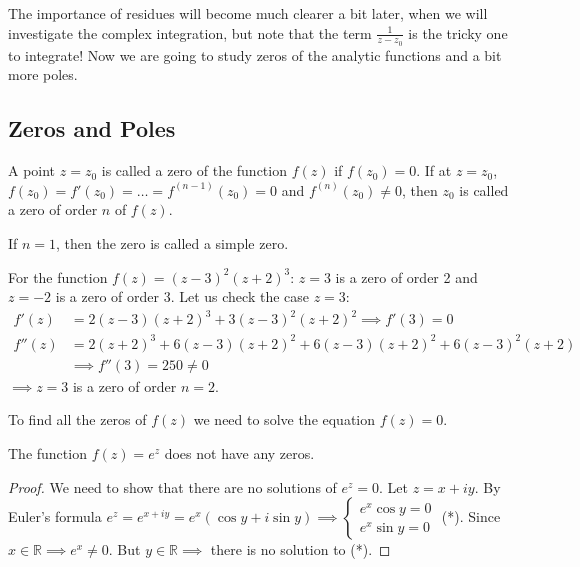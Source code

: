 The importance of residues will become much clearer a bit later, when we will investigate the complex integration, but note that the term $\frac{1}{z-z_0}$ is the tricky one to integrate! Now we are going to study zeros of the analytic functions and a bit more poles.

\subsection{Zeros and Poles}
\begin{definition}\label{definition:16.3} A point $z = z_0$ is called a zero of the function $f(z)$ if $f(z_0) = 0$. If at $z = z_0$, $f(z_0) = f'(z_0) = \dots = f^{(n-1)}(z_0) = 0$ and $f^{(n)}(z_0) \neq 0$, then $z_0$ is called a zero of order $n$ of $f(z)$.

If $n = 1$, then the zero is called a simple zero.
\end{definition}

\begin{example}\label{example:18.7} For the function $f(z) = (z-3)^2(z+2)^3$: $z = 3$ is a zero of order 2 and $z = -2$ is a zero of order 3. Let us check the case $z = 3$:
\begin{align*}
    f'(z) &= 2(z-3)(z+2)^3 + 3(z-3)^2(z+2)^2 \implies f'(3) = 0 \\
    f''(z) &= 2(z+2)^3 + 6(z-3)(z+2)^2 + 6(z-3)(z+2)^2 + 6(z-3)^2(z+2) \\
     &\implies f''(3) = 250 \neq 0
\end{align*}
$\implies z = 3$ is a zero of order $n = 2$.
\end{example}

\begin{remark}
    To find all the zeros of $f(z)$ we need to solve the equation $f(z) = 0$.
\end{remark}

\begin{example} \label{example:18.8} The function $f(z) = e^z$ does not have any zeros.
\begin{proof}
    We need to show that there are no solutions of $e^z = 0$. Let $z = x + iy$. By Euler's formula $e^z = e^{x+iy} = e^x(\cos y + i\sin y) \implies \begin{cases} e^x \cos y = 0 \\ e^x \sin y = 0 \end{cases}$ (*). Since $x \in \mathbb{R} \implies e^x \neq 0$. But $y \in \mathbb{R} \implies$ there is no solution to (*).
\end{proof}
\end{example}

